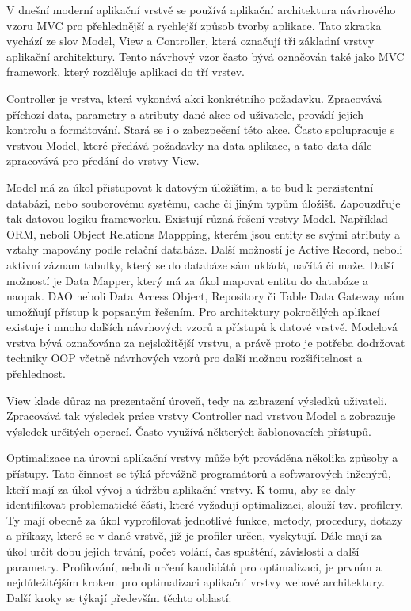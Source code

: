 \documentclass[12pt]{article}
\begin{document}
V dnešní moderní aplikační vrstvě se používá aplikační architektura návrhového vzoru MVC pro přehlednější a rychlejší způsob tvorby aplikace. Tato zkratka vychází ze slov Model, View a Controller, která označují tři základní vrstvy aplikační architektury. Tento návrhový vzor často bývá označován také jako MVC framework, který rozděluje aplikaci do tří vrstev. \cite{design-patterns}

Controller je vrstva, která vykonává akci konkrétního požadavku. Zpracovává příchozí data, parametry a atributy dané akce od uživatele, provádí jejich kontrolu a formátování. Stará se i o zabezpečení této akce. Často spolupracuje s vrstvou Model, které předává požadavky na data aplikace, a tato data dále zpracovává pro předání do vrstvy View. \cite{design-patterns}

Model má za úkol přistupovat k datovým úložištím, a to buď k perzistentní databázi, nebo souborovému systému, cache či jiným typům úložišť. Zapouzdřuje tak datovou logiku frameworku. Existují různá řešení vrstvy Model. Například ORM, neboli Object Relations Mappping, kterém jsou entity se svými atributy a vztahy mapovány podle relační databáze. Další možností je Active Record, neboli aktivní záznam tabulky, který se do databáze sám ukládá, načítá či maže. Další možností je Data Mapper, který má za úkol mapovat entitu do databáze a naopak. DAO neboli Data Access Object, Repository či Table Data Gateway nám umožňují přístup k popsaným řešením. Pro architektury pokročilých aplikací existuje i mnoho dalších návrhových vzorů a přístupů k datové vrstvě. Modelová vrstva bývá označována za nejsložitější vrstvu, a právě proto je potřeba dodržovat techniky OOP včetně návrhových vzorů pro další možnou rozšiřitelnost a přehlednost. \cite{design-patterns}

View klade důraz na prezentační úroveň, tedy na zabrazení výsledků uživateli. Zpracovává tak výsledek práce vrstvy Controller nad vrstvou Model a zobrazuje výsledek určitých operací. Často využívá některých šablonovacích přístupů. \cite{design-patterns}

\clearpage

\obrazek
{}

\label{sec:profiler}
Optimalizace na úrovni aplikační vrstvy může být prováděna několika způsoby a přístupy. Tato činnost se týká převážně programátorů a softwarových inženýrů, kteří mají za úkol vývoj a údržbu aplikační vrstvy. K tomu, aby se daly identifikovat problematické části, které vyžadují optimalizaci, slouží tzv. profilery. Ty mají obecně za úkol vyprofilovat jednotlivé funkce, metody, procedury, dotazy a příkazy, které se v dané vrstvě, již je profiler určen, vyskytují. Dále mají za úkol určit dobu jejich trvání, počet volání, čas spuštění, závislosti a další parametry. Profilování, neboli určení kandidátů pro optimalizaci, je prvním a nejdůležitějším krokem pro optimalizaci aplikační vrstvy webové architektury. Další kroky se týkají především těchto oblastí:
\end{document}
